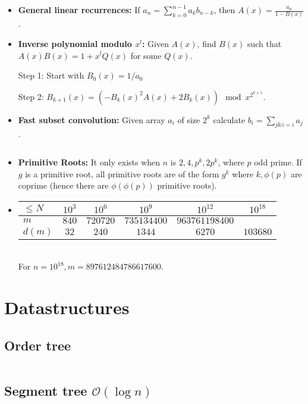 \documentclass[8pt,a4paper,landscape,oneside]{amsart}
\newcommand{\mintedstyle}[2]{\inputminted[fontsize=\normalsize,baselinestretch=.9,breaklines,tabsize=2]{#1}{code/#2}}
\newcommand{\code}[1]{\mintedstyle{cpp}{#1}}
\newcommand*\BitAnd{\mathrel{\&}}
\newenvironment{myitemize}
{\begin{itemize}[leftmargin=.3cm]
	\setlength{\itemsep}{0pt}
	\setlength{\parskip}{0pt}
	\setlength{\parsep}{0pt}     }
{ \end{itemize}                  }
\begin{document}
\begin{multicols*}{3}
\begin{myitemize}
\item \textbf{General linear recurrences:}
	If $a_n = \sum_{k=0}^{n-1} a_k b_{n-k}$, then $A(x) = \frac{a_0}{1-B(x)}$.

\item \textbf{Inverse polynomial modulo $x^l$:}
	Given $A(x)$, find $B(x)$ such that $A(x)B(x) = 1 + x^l Q(x)$ for some $Q(x)$.

	Step 1: Start with $B_0(x) = 1/a_0$

	Step 2: $B_{k+1}(x) = (-B_k(x)^2 A(x) + 2 B_k(x)) \mod x^{2^{k+1}}$.

\item \textbf{Fast subset convolution:}
	Given array $a_i$ of size $2^k$ calculate $b_i = \sum_{j \BitAnd i = i} a_j$.
	\code{math/subset_conv.cpp}

\item \textbf{Primitive Roots:}
	It only exists when $n$ is $2, 4, p^k, 2p^k$, where $p$ odd prime.
	If $g$ is a primitive root, all primitive roots are of the form $g^k$
	where $k,\phi(p)$ are coprime (hence there are $\phi(\phi(p))$ primitive roots).
	
\item \begin{tabular}{|l|ccccc|}
   \hline
   $\leq N$ & $10^3$ & $10^6$ & $10^9$ & $10^{12}$ & $10^{18}$ \\
   \hline
   $m$ & $840$ & $720720$ & $735134400$ & $963761198400$ & \\
   \hline
   $d(m)$ & $32$ & $240$ & $1344$ & $6270$ & $103680$ \\
   \hline
   \end{tabular}\\
   For $n = 10^{18}, m = 897612484786617600$.

\end{myitemize}

\section{Datastructures}
\subsection{Order tree}
\code{datastructures/order_statistic.cc}

\subsection{Segment tree $\mathcal{O}(\log n)$}


\end{multicols*}
\end{document}
